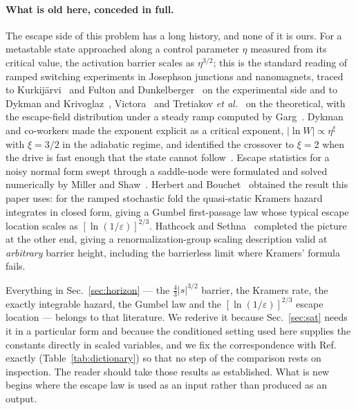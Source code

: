 \documentclass[%
 twocolumn,
 superscriptaddress,
 amsmath,amssymb,
 aps,
 pre,
 floatfix,
]{revtex4-2}
\begin{document}
\paragraph{What is old here, conceded in full.}
The escape side of this problem has a long history, and none of it is ours.  For a metastable state approached along a control parameter $\eta$ measured from its critical value, the activation barrier scales as $\eta^{3/2}$; this is the standard reading of ramped switching experiments in Josephson junctions and nanomagnets, traced to Kurkij\"arvi~\cite{Kurkijarvi1972} and Fulton and Dunkelberger~\cite{FultonDunkelberger1974} on the experimental side and to Dykman and Krivoglaz~\cite{DykmanKrivoglaz1980}, Victora~\cite{Victora1989} and Tretiakov \emph{et al.}~\cite{Tretiakov2003} on the theoretical, with the escape-field distribution under a steady ramp computed by Garg~\cite{Garg1995}.  Dykman and co-workers made the exponent explicit as a critical exponent, $|\ln W|\propto\eta^{\xi}$ with $\xi=3/2$ in the adiabatic regime, and identified the crossover to $\xi=2$ when the drive is fast enough that the state cannot follow~\cite{DykmanGoldingRyvkine2004,RyvkineDykmanGolding2004}.  Escape statistics for a noisy normal form swept through a saddle-node were formulated and solved numerically by Miller and Shaw~\cite{MillerShaw2012}.  Herbert and Bouchet~\cite{HerbertBouchet2017} obtained the result this paper uses: for the ramped stochastic fold the quasi-static Kramers hazard integrates in closed form, giving a Gumbel first-passage law whose typical escape location scales as $[\ln(1/\varepsilon)]^{2/3}$.  Hathcock and Sethna~\cite{HathcockSethna2021} completed the picture at the other end, giving a renormalization-group scaling description valid at \emph{arbitrary} barrier height, including the barrierless limit where Kramers' formula fails.

Everything in Sec.~\ref{sec:horizon} --- the $\tfrac43|s|^{3/2}$ barrier, the Kramers rate, the exactly integrable hazard, the Gumbel law and the $[\ln(1/\varepsilon)]^{2/3}$ escape location --- belongs to that literature.  We rederive it because Sec.~\ref{sec:sat} needs it in a particular form and because the conditioned setting used here supplies the constants directly in scaled variables, and we fix the correspondence with Ref.~\cite{HerbertBouchet2017} exactly (Table~\ref{tab:dictionary}) so that no step of the comparison rests on inspection.  The reader should take those results as established.  What is new begins where the escape law is used as an input rather than produced as an output.
\end{document}
